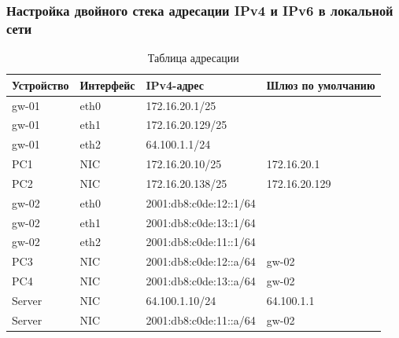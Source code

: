 \begin{frame}
\frametitle{Настройка двойного стека адресации IPv4 и IPv6 в локальной сети}
\begin{table}[]
  \centering
  \caption{Таблица адресации}
  \label{tab1}
\footnotesize
\begin{tabular}{|llll|}
\hline
\multicolumn{1}{|l|}{Устройство} & \multicolumn{1}{l|}{Интерфейс} & \multicolumn{1}{l|}{IPv4-адрес} & Шлюз по умолчанию \\ \hline
gw-01                            & eth0                           & 172.16.20.1/25                  &                   \\
gw-01                            & eth1                           & 172.16.20.129/25                &                   \\
gw-01                            & eth2                           & 64.100.1.1/24                   &                   \\ \hline
PC1                              & NIC                            & 172.16.20.10/25                 & 172.16.20.1       \\
PC2                              & NIC                            & 172.16.20.138/25                & 172.16.20.129     \\ \hline
gw-02                            & eth0                           & 2001:db8:c0de:12::1/64          &                   \\
gw-02                            & eth1                           & 2001:db8:c0de:13::1/64          &                   \\
gw-02                            & eth2                           & 2001:db8:c0de:11::1/64          &                   \\ \hline
PC3                              & NIC                            & 2001:db8:c0de:12::a/64          & gw-02             \\
PC4                              & NIC                            & 2001:db8:c0de:13::a/64          & gw-02             \\ \hline
Server                           & NIC                            & 64.100.1.10/24                  & 64.100.1.1        \\
Server                           & NIC                            & 2001:db8:c0de:11::a/64          & gw-02             \\ \hline
\end{tabular}
\end{table}
\end{frame}

